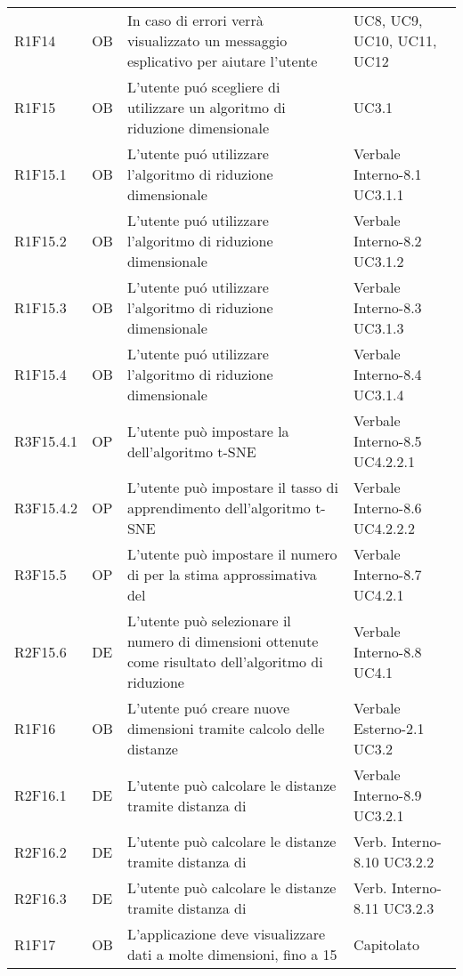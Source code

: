 {\begin{longtable}{C{2cm} | C{1.5cm} | C{9cm} | C{3.3cm}}
R1F14 & OB & In caso di errori verrà visualizzato un messaggio esplicativo per aiutare l'utente & UC8, UC9, UC10, UC11, UC12\\
R1F15 & OB & L'utente puó scegliere di utilizzare un algoritmo di riduzione dimensionale & UC3.1 \\
R1F15.1 & OB & L'utente puó utilizzare l'algoritmo di riduzione dimensionale  & Verbale Interno-8.1 \newline UC3.1.1 \\
R1F15.2 & OB & L'utente puó utilizzare l'algoritmo di riduzione dimensionale  & Verbale Interno-8.2 \newline UC3.1.2\\
R1F15.3 & OB & L'utente puó utilizzare l'algoritmo di riduzione dimensionale  & Verbale Interno-8.3 \newline UC3.1.3\\
R1F15.4 & OB & L'utente puó utilizzare l'algoritmo di riduzione dimensionale  & Verbale Interno-8.4 \newline UC3.1.4\\
R3F15.4.1 & OP & L'utente può impostare la  dell'algoritmo t-SNE & Verbale Interno-8.5 \newline UC4.2.2.1\\
R3F15.4.2 & OP & L'utente può impostare il tasso di apprendimento dell'algoritmo t-SNE & Verbale Interno-8.6 \newline UC4.2.2.2\\
R3F15.5 & OP & L'utente può impostare il numero di  per la stima approssimativa del  & Verbale Interno-8.7 \newline UC4.2.1\\
R2F15.6 & DE & L'utente può selezionare il numero di dimensioni ottenute come risultato dell'algoritmo di riduzione & Verbale Interno-8.8 \newline UC4.1\\
R1F16 & OB & L'utente puó creare nuove dimensioni tramite calcolo delle distanze & Verbale Esterno-2.1 \newline UC3.2\\ 
R2F16.1 & DE & L'utente può calcolare le distanze tramite distanza di  &  Verbale Interno-8.9 \newline UC3.2.1\\
R2F16.2 & DE & L'utente può calcolare le distanze tramite distanza di  & Verb. Interno-8.10 \newline UC3.2.2 \\
R2F16.3 & DE & L'utente può calcolare le distanze tramite distanza di  &  Verb. Interno-8.11 \newline UC3.2.3\\
R1F17 & OB & L'applicazione deve visualizzare dati a molte dimensioni, fino a 15 & Capitolato\\


\end{longtable}
}







